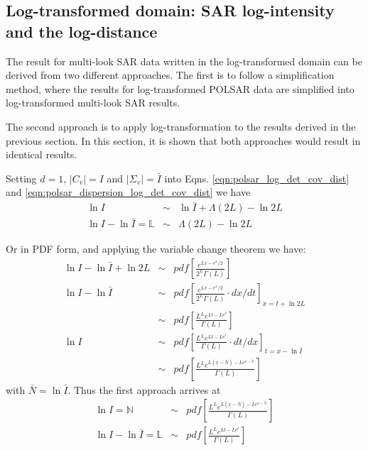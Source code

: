 \documentclass[journal]{IEEEtran}
\begin{document}
\subsection{Log-transformed domain: SAR log-intensity and the log-distance}

The result for multi-look SAR data written in the log-transformed domain can be derived from two different approaches.
The first is to follow a simplification method, where the results for log-transformed POLSAR data are simplified into log-transformed multi-look SAR results.

The second approach is to apply log-transformation to the results derived in the previous section. In this section, it is shown that both approaches would result in identical results.

Setting $d=1$, $|C_v|=I$ and $|\Sigma_v|=\bar{I}$ into Eqns. \ref{eqn:polsar_log_det_cov_dist} and \ref{eqn:polsar_dispersion_log_det_cov_dist}
we have
\begin{eqnarray*}
  \ln{I} &\sim& \ln{\bar{I}} + \Lambda(2L) - \ln{2L}  \\
  \ln{I} - \ln{\bar{I}} = \mathbb{L} &\sim& \Lambda(2L) - \ln{2L} 
\end{eqnarray*}

Or in PDF form, and applying the variable change theorem we have:
\begin{eqnarray*}
  \ln{I} - \ln{\bar{I}} + \ln{2L} &\sim& pdf \left[ \frac{e^{Lx-e^x/2}}{2^L \Gamma(L)} \right] \\
  \ln{I} - \ln{\bar{I}} &\sim& pdf \left[ \frac{e^{Lx-e^x/2}}{2^L \Gamma(L)} \cdot dx/dt \right]_{x=t+\ln{2L}} \\
   &\sim& pdf \left[ \frac{L^Le^{Lt-Le^t}}{ \Gamma(L)}  \right] \\
  \ln{I} &\sim&  pdf \left[ \frac{L^Le^{Lt-Le^t}}{ \Gamma(L)} \cdot dt/dx \right]_{t=x-\ln{\bar{I}}} \\
 &\sim&  pdf \left[ \frac{L^Le^{L(x-\bar{N})-Le^{x-\bar{N}}}}{ \Gamma(L)} \right] 
\end{eqnarray*}
with $\bar{N} = \ln{\bar{I}}$. Thus the first approach arrives at
\begin{eqnarray}
   \ln{I} = \mathbb{N} &\sim&  pdf \left[ \frac{L^Le^{L(x-\bar{N})-Le^{x-\bar{N}}}}{ \Gamma(L)} \right] \\
   \ln{I} - \ln{\bar{I}} = \mathbb{L} &\sim& pdf \left[ \frac{L^Le^{Lt-Le^t}}{ \Gamma(L)}  \right]  
\end{eqnarray}
\end{document}
